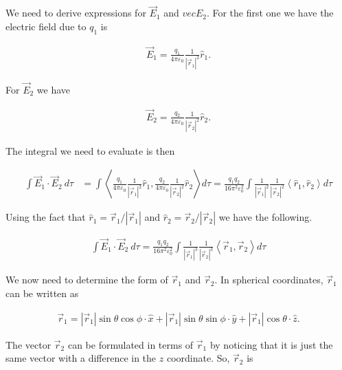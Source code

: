 \documentclass{article}
\newcommand{\xvec}{\hat{x}}
\newcommand{\yvec}{\hat{y}}
\newcommand{\zvec}{\hat{z}}
\newcommand{\rvec}[1]{\vec{r}_{#1}}
\begin{document}
\begin{center}
    
\end{center}

We need to derive expressions for $\vec{E}_1$ and $vec{E}_2$. For the first one we have the electric field due to $q_1$ is 

\begin{align*}
    \vec{E}_1 = \frac{q_1}{4\pi\varepsilon_0}\frac{1}{|\vec{r}_1|^2}\hat{r}_1.
\end{align*}

For $\vec{E}_2$ we have 

\begin{align*}
    \vec{E}_2 = \frac{q_2}{4\pi\varepsilon_0}\frac{1}{|\vec{r}_2|^2}\hat{r}_2.
\end{align*}

\pagebreak

The integral we need to evaluate is then 

\begin{align*}
    \int \vec{E}_1 \cdot \vec{E}_2\ d\tau &= \int \left\langle \frac{q_1}{4\pi\varepsilon_0}\frac{1}{|\vec{r}_1|^2}\hat{r}_1, \frac{q_2}{4\pi\varepsilon_0}\frac{1}{|\vec{r}_2|^2}\hat{r}_2 \right\rangle d\tau = \frac{q_1q_2}{16\pi^2\varepsilon^2_0} \int \frac{1}{|\vec{r}_1|^2}\frac{1}{|\vec{r}_2|^2} \left\langle \hat{r}_1, \hat{r}_2 \right\rangle d\tau
\end{align*}

Using the fact that $\hat{r}_1 = \vec{r}_1/|\vec{r}_1|$ and $\hat{r}_2 = \vec{r}_2/|\vec{r}_2|$ we have the following. 

\begin{align*}
    \int \vec{E}_1 \cdot \vec{E}_2\ d\tau = \frac{q_1q_2}{16\pi^2\varepsilon^2_0} \int \frac{1}{|\vec{r}_1|^3}\frac{1}{|\vec{r}_2|^3} \left\langle \vec{r}_1, \vec{r}_2 \right\rangle d\tau
\end{align*}

We now need to determine the form of $\vec{r}_1$ and $\vec{r}_2$. In spherical coordinates, $\rvec{1}$ can be written as 

\begin{align*}
    \rvec{1} = |\rvec{1}|\sin\theta\cos\phi\cdot\xvec + |\rvec{1}|\sin\theta\sin\phi\cdot\yvec + |\rvec{1}|\cos\theta\cdot\zvec.
\end{align*}

The vector $\rvec{2}$ can be formulated in terms of $\rvec{1}$ by noticing that it is just the same vector with a difference in the $z$ coordinate. So, $\rvec{2}$ is 
\end{document}
